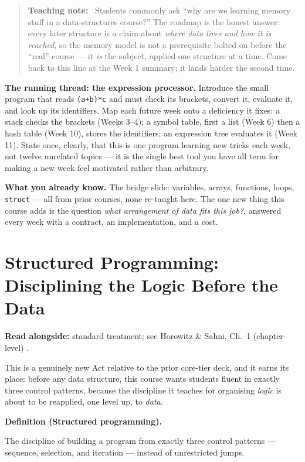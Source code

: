 \documentclass[11pt]{article}
\newenvironment{definitionbox}[1]{%
  \par\noindent\textbf{Definition (#1).}\ \itshape
}{\par\vspace{0.3em}}
\newenvironment{teachingaside}{\begin{quote}\small\color{primary-gold}\textbf{Teaching note:}\ }{\end{quote}}
\begin{document}
\begin{teachingaside}
Students commonly ask ``why are we learning memory stuff in a data-structures course?'' The roadmap is the honest answer: every later structure is a claim about \emph{where data lives and how it is reached}, so the memory model is not a prerequisite bolted on before the ``real'' course --- it \emph{is} the subject, applied one structure at a time. Come back to this line at the Week 1 summary; it lands harder the second time.
\end{teachingaside}

\textbf{The running thread: the expression processor.} Introduce the small program that reads \texttt{(a+b)*c} and must check its brackets, convert it, evaluate it, and look up its identifiers. Map each future week onto a deficiency it fixes: a stack checks the brackets (Weeks 3--4); a symbol table, first a list (Week 6) then a hash table (Week 10), stores the identifiers; an expression tree evaluates it (Week 11). State once, clearly, that this is one program learning new tricks each week, not twelve unrelated topics --- it is the single best tool you have all term for making a new week feel motivated rather than arbitrary.

\textbf{What you already know.} The bridge slide: variables, arrays, functions, loops, \texttt{struct} --- all from prior courses, none re-taught here. The one new thing this course adds is the question \emph{what arrangement of data fits this job?}, answered every week with a contract, an implementation, and a cost.

\section{Structured Programming: Disciplining the Logic Before the Data}
\label{sec:structured}

\textbf{Read alongside:} standard treatment; see Horowitz \& Sahni, Ch.~1 (chapter-level) \cite{HorowitzSahni2008_fundamentals_data_structures}.

This is a genuinely new Act relative to the prior core-tier deck, and it earns its place: before any data structure, this course wants students fluent in exactly three control patterns, because the discipline it teaches for organising \emph{logic} is about to be reapplied, one level up, to \emph{data}.

\begin{definitionbox}{Structured programming}
The discipline of building a program from exactly three control patterns --- sequence, selection, and iteration --- instead of unrestricted jumps.
\end{definitionbox}
\end{document}
